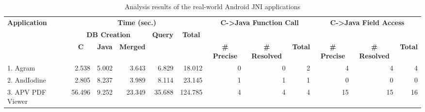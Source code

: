 \begin{table*}[t]
  \vspace{2mm}
  \caption{Analysis results of the real-world Android JNI applications}
  \label{table:RQ1-2}
  \vspace*{-1em}
  \centering
  \small
\renewcommand{\arraystretch}{.9}
  \begin{tabular}{l||r|r|r|r|r||r|r|r||r|r|r}
    \multirow{3}{*}{\textbf{Application}} & \multicolumn{5}{c||}{\textbf{Time (sec.)}} & \multicolumn{3}{c||}{\multirow{2}{*}{\textbf{C->Java Function Call}}} & \multicolumn{3}{c}{\multirow{2}{*}{\textbf{C->Java Field Access}}} \\\hhline{~||-----||~~~||~~~}
    & \multicolumn{3}{c|}{\textbf{DB Creation}} & \multicolumn{1}{c|}{\multirow{2}{*}{\textbf{Query}}} & \multicolumn{1}{c||}{\multirow{2}{*}{\textbf{Total}}} & \multicolumn{3}{c||}{} & \multicolumn{3}{c}{} \\\hhline{~||---~|~||------}
    & \multicolumn{1}{c|}{\textbf{C}} & \multicolumn{1}{c|}{\textbf{Java}} & \multicolumn{1}{c|}{\textbf{Merged}} & \multicolumn{1}{c|}{} & \multicolumn{1}{c||}{} & \multicolumn{1}{c|}{\textbf{\# Precise}} & \multicolumn{1}{c|}{\textbf{\# Resolved}} & \multicolumn{1}{c||}{\textbf{Total}} & \multicolumn{1}{c|}{\textbf{\# Precise}} & \multicolumn{1}{c|}{\textbf{\# Resolved}} & \multicolumn{1}{l}{\textbf{Total}}  \\\hhline{=#*{4}{=|}=#=|=|=#=|=|=}
  1. Agram                  & 2.538                 & 5.002                    & 3.643                      & 6.829                                      & 18.012                                  & 0                           & 0                            & 2                         & 4                           & 4                            & 4                          \\
  2. AndIodine              & 2.805                 & 8.237                    & 3.989                      & 8.114                                      & 23.145                                  & 1                           & 1                            & 1                         & 0                           & 0                            & 0                          \\
  3. APV PDF Viewer         & 56.496                & 9.252                    & 23.349                     & 35.688                                     & 124.785                                 & 4                           & 4                            & 4                         & 15                          & 15                           & 16                         \\

\end{tabular}
\end{table*}
